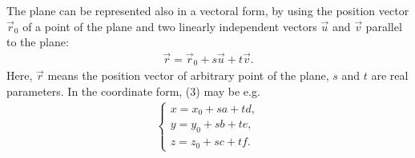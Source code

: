 \documentclass[12pt]{article}
\theoremstyle{definition}
\begin{document}
The plane can be represented also in a vectoral form, by using the position vector $\vec{r}_0$ of a point of the plane and two linearly independent vectors $\vec{u}$ and $\vec{v}$ parallel to the plane:
\begin{align}
\vec{r} = \vec{r}_0+s\vec{u}+t\vec{v}.
\end{align}
Here, $\vec{r}$ means the position vector of arbitrary point of the plane, $s$ and $t$ are  real parameters.  In the coordinate form, (3) may be e.g.
\begin{align*}
\begin{cases}
                x = x_0+sa+td,\\  
                y = y_0+sb+te,\\
                z = z_0+sc+tf.
\end{cases}
\end{align*}



\end{document}

